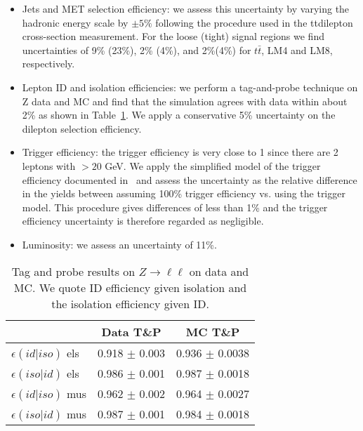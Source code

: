 \begin{itemize}
  
\item Jets and MET selection efficiency: we assess this uncertainty by varying the hadronic energy scale by $\pm 5\%$
  following the procedure used in the ttdilepton cross-section measurement.  For the loose (tight) signal regions 
  we find uncertainties of 9\% (23\%), 2\% (4\%), and 2\%(4\%) for  $t\bar{t}$, LM4 and LM8, respectively.
\item Lepton ID and isolation efficiencies: we perform a tag-and-probe technique
  on Z data and MC and find that the simulation agrees with data within about 2\% as shown in Table~\ref{tab:tagandprobe}.
  We apply a conservative 5\% uncertainty on the dilepton selection efficiency.
\item Trigger efficiency: the trigger efficiency is very close to 1 since there are 2 leptons with \pt $> 20$ GeV.
  We apply the simplified model of the trigger efficiency documented in~\cite{ref:GenericOS} and assess the uncertainty
  as the relative difference in the yields between assuming 100\% trigger efficiency vs. using the trigger model. This
  procedure gives differences of less than 1\% and the trigger efficiency uncertainty is therefore regarded as negligible.
\item Luminosity: we assess an uncertainty of 11\%.

\end{itemize}

\begin{table}[hbt]
\begin{center}
\caption{\label{tab:tagandprobe} Tag and probe results on $Z \to \ell \ell$
on data and MC.  We quote ID efficiency given isolation and 
the isolation efficiency given ID. }
\begin{tabular}{|l||c|c|}
\hline
                       & Data  T\&P        & MC T\&P               \\  
\hline
$\epsilon(id|iso)$ els & 0.918 $\pm$ 0.003 & 0.936 $\pm$ 0.0038    \\ 
$\epsilon(iso|id)$ els & 0.986 $\pm$ 0.001 & 0.987 $\pm$ 0.0018    \\
$\epsilon(id|iso)$ mus & 0.962 $\pm$ 0.002 & 0.964 $\pm$ 0.0027    \\
$\epsilon(iso|id)$ mus & 0.987 $\pm$ 0.001 & 0.984 $\pm$ 0.0018    \\
\hline

\end{tabular}
\end{center}
\end{table}

